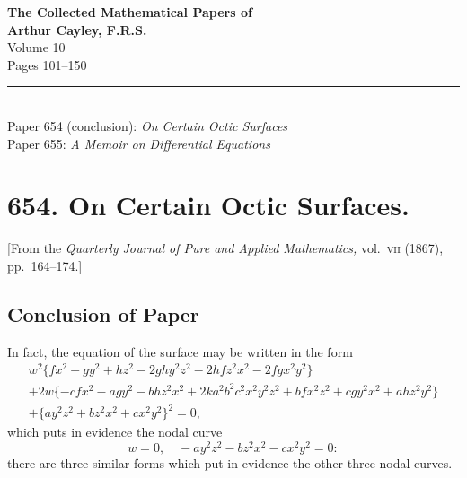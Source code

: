 \documentclass[12pt,a4paper]{article}
\theoremstyle{plain}
\begin{document}
\begin{center}
{\Large\bfseries The Collected Mathematical Papers of\\[0.3em] Arthur Cayley, F.R.S.}\\[1em]
{\large Volume 10}\\[2em]
{\large Pages 101--150}\\[1em]
\rule{0.6\textwidth}{0.4pt}\\[1em]
{\normalsize Paper 654 (conclusion): \textit{On Certain Octic Surfaces}}\\[0.3em]
{\normalsize Paper 655: \textit{A Memoir on Differential Equations}}\\[2em]
\end{center}

\thispagestyle{empty}
\newpage
\setcounter{page}{101}

\section*{654. On Certain Octic Surfaces.}

\begin{center}
[From the \textit{Quarterly Journal of Pure and Applied Mathematics,} vol.~\textsc{vii} (1867), pp.~164--174.]
\end{center}

\subsection*{Conclusion of Paper}

\setcounter{equation}{0}
\setcounter{page}{101}

In fact, the equation of the surface may be written in the form
%
\begin{multline}
w^{2} \{f x^{2} + g y^{2} + h z^{2} - 2gh y^{2} z^{2} - 2hf z^{2} x^{2} - 2fg x^{2} y^{2}\} \\
+ 2w \{-cf x^{2} - ag y^{2} - bh z^{2} x^{2} + 2k a^{2} b^{2} c^{2} x^{2} y^{2} z^{2}
+ bf x^{2} z^{2} + cg y^{2} x^{2} + ah z^{2} y^{2}\} \\
+ \{ay^{2} z^{2} + bz^{2} x^{2} + cx^{2} y^{2}\}^{2} = 0,
\end{multline}
%
which puts in evidence the nodal curve
\[
w = 0, \quad -ay^{2} z^{2} - bz^{2} x^{2} - cx^{2} y^{2} = 0:
\]
there are three similar forms which put in evidence the other three nodal curves.
\end{document}
